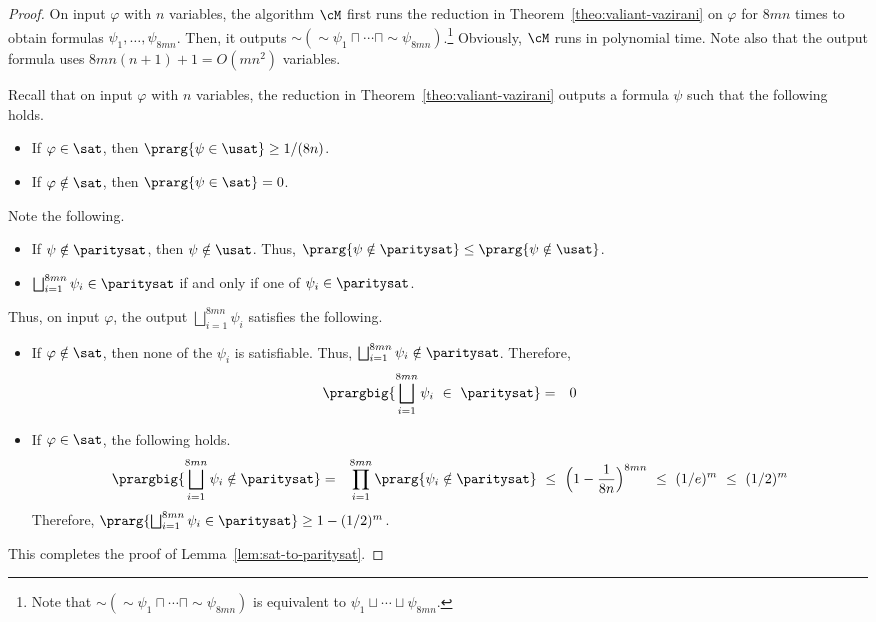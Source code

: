 \documentclass[11pt, a4paper]{article}
\begin{document}
\begin{proof}
On input $\varphi$ with $n$ variables, 
the algorithm $\cM$ first runs the reduction in Theorem~\ref{theo:valiant-vazirani} on $\varphi$
for $8mn$ times to obtain formulas $\psi_1,\ldots,\psi_{8mn}$.
Then, it outputs $\sim (\sim\psi_1  \sqcap  \cdots  \sqcap  \sim \psi_{8mn})$.\footnote{Note that 
$\sim (\sim\psi_1  \sqcap  \cdots \sqcap  \sim \psi_{8mn})$ is equivalent to $\psi_1\sqcup \cdots\sqcup \psi_{8mn}$.}
Obviously, $\cM$ runs in polynomial time.
Note also that the output formula uses $8mn(n+1)+1=O(mn^2)$ variables.

Recall that on input $\varphi$ with $n$ variables,
the reduction in Theorem~\ref{theo:valiant-vazirani} outputs a formula $\psi$ such that
the following holds.
\begin{itemize}
\item
If $\varphi \in \sat$, then $\prarg{\psi \in\usat}\geq 1/(8n)$.
\item
If $\varphi \notin \sat$, then $\prarg{\psi \in\sat}=0$.
\end{itemize}
Note the following.
\begin{itemize}
\item
If $\psi \notin \paritysat$, then $\psi \notin \usat$. Thus,
$\prarg {\psi\notin \paritysat} \leq \prarg {\psi\notin \usat}$.
\item
$\bigsqcup_{i=1}^{8mn} \psi_i \in\paritysat$ if and only if one of $\psi_i \in \paritysat$. 
\end{itemize}
Thus, on input $\varphi$, the output $\bigsqcup_{i=1}^{8mn} \psi_i$ satisfies the following.
\begin{itemize}
\item
If $\varphi \notin \sat$, then none of the $\psi_i$ is satisfiable.
Thus, $\bigsqcup_{i=1}^{8mn} \psi_i \notin \paritysat$.
Therefore, 
\begin{eqnarray*}
\prargbig{ \bigsqcup_{i=1}^{8mn} \psi_i \ \in\ \paritysat } & = & 0
\end{eqnarray*}
\item
If $\varphi \in \sat$, the following holds.
\begin{eqnarray*}
\prargbig {\bigsqcup_{i=1}^{8mn} \psi_i \notin  \paritysat} & = &
\prod_{i=1}^{8mn} \prarg{\psi_i \notin \paritysat} 
\ \leq\
\Big(1-\frac{1}{8n}\Big)^{8mn}
\ \leq \ (1/e)^{m}
\ \leq \ (1/2)^{m}
\end{eqnarray*}
Therefore, $\prarg{\bigsqcup_{i=1}^{8mn} \psi_i  \in  \paritysat} \geq 1-(1/2)^m$.
\end{itemize}
This completes the proof of Lemma~\ref{lem:sat-to-paritysat}.
\end{proof}
\end{document}
